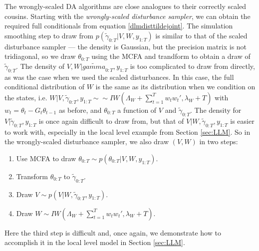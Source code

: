 \documentclass{article}
\begin{document}
The wrongly-scaled DA algorithms are close analogues to their correctly scaled cousins. Starting with the {\it wrongly-scaled disturbance sampler}, we can obtain the required full conditionals from equation \eqref{dlmdisttildejoint}. The simulation smoothing step to draw from $p(\tilde{\gamma}_{0:T}|V,W,y_{1:T})$ is similar to that of the scaled disturbance sampler --- the density is Gaussian, but the precision matrix is not tridiagonal, so we draw $\theta_{0:T}$ using the MCFA and trandform to obtain a draw of $\tilde{\gamma}_{0:T}$. The density of $V,W|\tilde{gamma}_{0:T},y_{1:T}$ is too complicated to draw from directly, as was the case when we used the scaled disturbances. In this case, the full conditional distribution of $W$ is the same as its distribution when we condition on the states, i.e. $W|V,\tilde{\gamma}_{0:T},y_{1:T} \sim \sim IW\left(\Lambda_W + \sum_{t=1}^Tw_tw_t',\lambda_{W} + T\right)$ with $w_t = \theta_t - G_t\theta_{t-1}$ as before, and $\theta_{0:T}$ a function of $V$ and $\tilde{\gamma}_{0:T}$. The density for $V|\tilde{\gamma}_{0:T},y_{1:T}$ is once again difficult to draw from, but that of $V|W,\tilde{\gamma}_{0:T},y_{1:T}$ is easier to work with, especially in the local level example from Section \ref{sec:LLM}. So in the wrongly-scaled disturbance sampler, we also draw $(V,W)$ in two steps: 
\begin{enumerate}
\item Use MCFA to draw $\theta_{0:T} \sim p(\theta_{0:T}|V,W,y_{1:T})$.
\item Transform $\theta_{0:T}$ to $\tilde{\gamma}_{0:T}$.
\item Draw $V \sim p(V|W,\tilde{\gamma}_{0:T},y_{1:T})$.
\item Draw $W \sim IW\left(\Lambda_W + \sum_{t=1}^Tw_tw_t',\lambda_{W} + T\right)$.
\end{enumerate}
Here the third step is difficult and, once again, we demonstrate how to accomplish it in the local level model in Section \ref{sec:LLM}.
\end{document}
